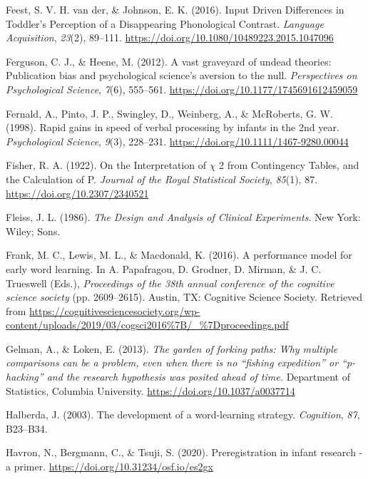 \documentclass[
  english,
  man, noextraspace]{apa6}
\newlength{\cslhangindent}
\newenvironment{cslreferences}%
  {\setlength{\parindent}{0pt}%
  \everypar{\setlength{\hangindent}{\cslhangindent}}\ignorespaces}%
  {\par}
\begin{document}
\begin{cslreferences}
\leavevmode\hypertarget{ref-VanderFeest2016}{}%
Feest, S. V. H. van der, \& Johnson, E. K. (2016). Input Driven Differences in Toddler's Perception of a Disappearing Phonological Contrast. \emph{Language Acquisition}, \emph{23}(2), 89--111. \url{https://doi.org/10.1080/10489223.2015.1047096}

\leavevmode\hypertarget{ref-Ferguson2012}{}%
Ferguson, C. J., \& Heene, M. (2012). A vast graveyard of undead theories: Publication bias and psychological science's aversion to the null. \emph{Perspectives on Psychological Science}, \emph{7}(6), 555--561. \url{https://doi.org/10.1177/1745691612459059}

\leavevmode\hypertarget{ref-Fernald1998}{}%
Fernald, A., Pinto, J. P., Swingley, D., Weinberg, A., \& McRoberts, G. W. (1998). Rapid gains in speed of verbal processing by infants in the 2nd year. \emph{Psychological Science}, \emph{9}(3), 228--231. \url{https://doi.org/10.1111/1467-9280.00044}

\leavevmode\hypertarget{ref-Fisher1922}{}%
Fisher, R. A. (1922). On the Interpretation of \(\chi\) 2 from Contingency Tables, and the Calculation of P. \emph{Journal of the Royal Statistical Society}, \emph{85}(1), 87. \url{https://doi.org/10.2307/2340521}

\leavevmode\hypertarget{ref-Fleiss1986}{}%
Fleiss, J. L. (1986). \emph{The Design and Analysis of Clinical Experiments}. New York: Wiley; Sons.

\leavevmode\hypertarget{ref-Frank2016}{}%
Frank, M. C., Lewis, M. L., \& Macdonald, K. (2016). A performance model for early word learning. In A. Papafragou, D. Grodner, D. Mirman, \& J. C. Trueswell (Eds.), \emph{Proceedings of the 38th annual conference of the cognitive science society} (pp. 2609--2615). Austin, TX: Cognitive Science Society. Retrieved from \url{https://cognitivesciencesociety.org/wp-content/uploads/2019/03/cogsci2016\%7B/_\%7Dproceedings.pdf}

\leavevmode\hypertarget{ref-Gelman2013}{}%
Gelman, A., \& Loken, E. (2013). \emph{The garden of forking paths: Why multiple comparisons can be a problem, even when there is no ``fishing expedition'' or ``p-hacking'' and the research hypothesis was posited ahead of time.} Department of Statistics, Columbia University. \url{https://doi.org/10.1037/a0037714}

\leavevmode\hypertarget{ref-Halberda2003}{}%
Halberda, J. (2003). The development of a word-learning strategy. \emph{Cognition}, \emph{87}, B23--B34.

\leavevmode\hypertarget{ref-Havron}{}%
Havron, N., Bergmann, C., \& Tsuji, S. (2020). Preregistration in infant research - a primer. \url{https://doi.org/10.31234/osf.io/es2gx}


\end{cslreferences}
\end{document}
